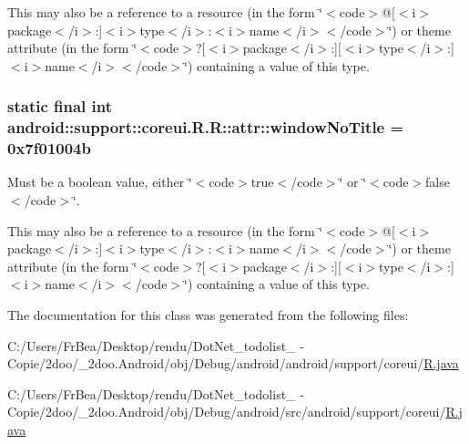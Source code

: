 This may also be a reference to a resource (in the form \char`\"{}$<$code$>$@\mbox{[}$<$i$>$package$<$/i$>$:\mbox{]}$<$i$>$type$<$/i$>$:$<$i$>$name$<$/i$>$$<$/code$>$\char`\"{}) or theme attribute (in the form \char`\"{}$<$code$>$?\mbox{[}$<$i$>$package$<$/i$>$:\mbox{]}\mbox{[}$<$i$>$type$<$/i$>$:\mbox{]}$<$i$>$name$<$/i$>$$<$/code$>$\char`\"{}) containing a value of this type. \hypertarget{classandroid_1_1support_1_1coreui_1_1_r_1_1attr_80ccc6b67e5838ed462f4681d2d2687a}{
\subsubsection[{windowNoTitle}]{\setlength{\rightskip}{0pt plus 5cm}static final int android::support::coreui.R.R::attr::windowNoTitle = 0x7f01004b}}
\label{classandroid_1_1support_1_1coreui_1_1_r_1_1attr_80ccc6b67e5838ed462f4681d2d2687a}


Must be a boolean value, either \char`\"{}$<$code$>$true$<$/code$>$\char`\"{} or \char`\"{}$<$code$>$false$<$/code$>$\char`\"{}. 

This may also be a reference to a resource (in the form \char`\"{}$<$code$>$@\mbox{[}$<$i$>$package$<$/i$>$:\mbox{]}$<$i$>$type$<$/i$>$:$<$i$>$name$<$/i$>$$<$/code$>$\char`\"{}) or theme attribute (in the form \char`\"{}$<$code$>$?\mbox{[}$<$i$>$package$<$/i$>$:\mbox{]}\mbox{[}$<$i$>$type$<$/i$>$:\mbox{]}$<$i$>$name$<$/i$>$$<$/code$>$\char`\"{}) containing a value of this type. 

The documentation for this class was generated from the following files:\begin{CompactItemize}
\item 
C:/Users/FrBea/Desktop/rendu/DotNet\_\-todolist\_ - Copie/2doo/\_\-2doo.Android/obj/Debug/android/android/support/coreui/\hyperlink{android_2support_2coreui_2_r_8java}{R.java}\item 
C:/Users/FrBea/Desktop/rendu/DotNet\_\-todolist\_ - Copie/2doo/\_\-2doo.Android/obj/Debug/android/src/android/support/coreui/\hyperlink{src_2android_2support_2coreui_2_r_8java}{R.java}\end{CompactItemize}
